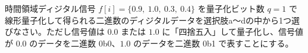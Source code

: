 時間領域ディジタル信号 $f[i] = \{0.9,\ 1.0,\ 0.3,\ 0.4 \}$ を量子化ビット数 $q = 1$ で線形量子化して得られる二進数のディジタルデータを選択肢a〜dの中から1つ選びなさい。ただし信号値は $0.0$ または $1.0$ に「四捨五入」して量子化し、信号値が $0.0$ のデータを二進数 0b0、$1.0$ のデータを二進数 0b1 で表すことにする。
